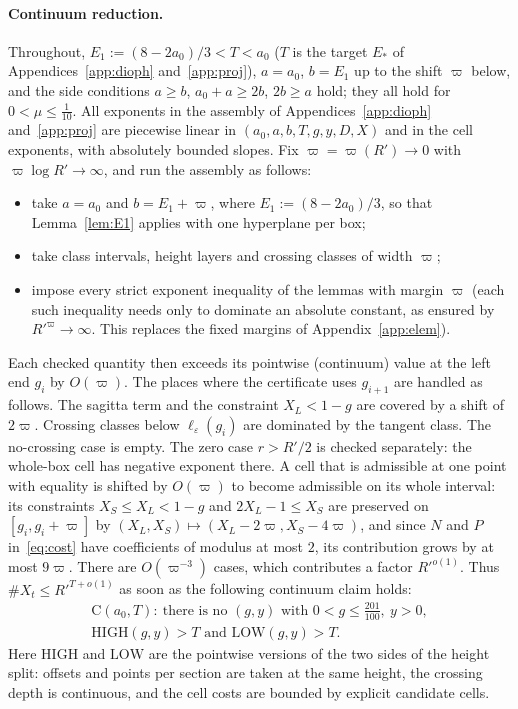 \documentclass[aps,prx,twocolumn,superscriptaddress,nofootinbib,longbibliography]{revtex4-2}
\theoremstyle{plain}
\theoremstyle{definition}
\theoremstyle{remark}
\begin{document}
\paragraph{Continuum reduction.} Throughout, $E_1:=(8-2a_0)/3<T<a_0$ ($T$ is the target $E_*$ of Appendices~\ref{app:dioph} and~\ref{app:proj}), $a=a_0$, $b=E_1$ up to the shift $\varpi$ below, and the side conditions
$a\ge b$, $a_0+a\ge2b$, $2b\ge a$ hold; they all hold for $0<\mu\le\frac1{10}$. All exponents in the assembly of Appendices~\ref{app:dioph}
and~\ref{app:proj} are piecewise linear in $(a_0,a,b,T,g,y,D,X)$ and in the cell exponents, with
absolutely bounded slopes. Fix $\varpi=\varpi(R')\to0$ with $\varpi\log R'\to\infty$, and run the assembly
as follows:
\begin{itemize}\setlength\itemsep{0pt}
\item take $a=a_0$ and $b=E_1+\varpi$, where $E_1:=(8-2a_0)/3$, so that Lemma~\ref{lem:E1} applies with one
hyperplane per box;
\item take class intervals, height layers and crossing classes of width $\varpi$;
\item impose every strict exponent inequality of the lemmas with margin $\varpi$ (each such inequality needs only to dominate an absolute constant, as ensured by $R'^{\varpi}\to\infty$. This replaces the fixed margins of Appendix~\ref{app:elem}).
\end{itemize}
Each checked quantity then exceeds its pointwise (continuum) value at the left end $g_i$ by $O(\varpi)$.
The places where the certificate uses $g_{i+1}$ are handled as follows. The sagitta term and the constraint
$X_L<1-g$ are covered by a shift of $2\varpi$. Crossing classes below $\ell_\varepsilon(g_i)$ are dominated by the
tangent class. The no-crossing case is empty. The zero case $r>R'/2$ is checked separately: the whole-box
cell has negative exponent there. A cell that is admissible
at one point with equality is shifted by $O(\varpi)$ to become admissible on its whole interval: its constraints $X_S\le X_L<1-g$ and $2X_L-1\le X_S$ are preserved on $[g_i,g_i+\varpi]$ by $(X_L,X_S)\mapsto(X_L-2\varpi,X_S-4\varpi)$, and since $N$ and $P$ in~\eqref{eq:cost} have coefficients of modulus at most $2$, its contribution grows by at most $9\varpi$. There are
$O(\varpi^{-3})$ cases, which contributes a factor $R'^{o(1)}$. Thus $\#X_t\le R'^{T+o(1)}$ as soon as the
following continuum claim holds:
\begin{multline*}
\mathrm C(a_0,T):\ \text{there is no }(g,y)\text{ with }0<g\le\tfrac{201}{100},\ y>0,\\
\mathrm{HIGH}(g,y)>T\text{ and }\mathrm{LOW}(g,y)>T .
\end{multline*}
Here $\mathrm{HIGH}$ and $\mathrm{LOW}$ are the pointwise versions of the two sides of the height split:
offsets and points per section are taken at the same height, the crossing depth is continuous, and the
cell costs are bounded by explicit candidate cells.
\end{document}
